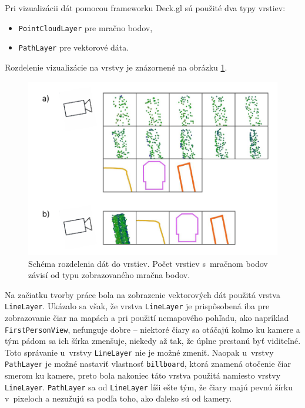 Pri vizualizácii dát pomocou frameworku Deck.gl sú použité dva typy vrstiev:
\begin{itemize}
    \item \texttt{PointCloudLayer} pre mračno bodov,
    \item \texttt{PathLayer} pre vektorové dáta.
\end{itemize}
Rozdelenie vizualizácie na vrstvy je znázornené na obrázku \ref{fig:vrstvy}.

\begin{figure}[h]
    \centering
    \includegraphics[width=0.8\linewidth]{text_prace/obrazky-figures/vrstvy.pdf}
    \caption[Schéma rozdelenia dát do vrstiev.]{Schéma rozdelenia dát do vrstiev. Počet vrstiev s~mračnom bodov závisí od typu zobrazovaného mračna bodov.}
    \label{fig:vrstvy}
\end{figure}

Na začiatku tvorby práce bola na zobrazenie vektorových dát použitá vrstva \texttt{LineLayer}. Ukázalo sa však, že vrstva \texttt{LineLayer} je prispôsobená iba pre zobrazovanie čiar na mapách a pri použití nemapového pohľadu, ako napríklad \texttt{FirstPersonView}, nefunguje dobre -- niektoré čiary sa otáčajú kolmo ku kamere a tým pádom sa ich šírka zmenšuje, niekedy až tak, že úplne prestanú byť viditeľné. Toto správanie u~vrstvy \texttt{LineLayer} nie je možné zmeniť. Naopak u~vrstvy \texttt{PathLayer} je možné nastaviť vlastnosť \texttt{billboard}, ktorá znamená otočenie čiar smerom ku kamere, preto bola nakoniec táto vrstva použitá namiesto vrstvy \texttt{LineLayer}. \texttt{PathLayer} sa od \texttt{LineLayer} líši ešte tým, že čiary majú pevnú šírku v~pixeloch a nezužujú sa podľa toho, ako ďaleko sú od kamery.


